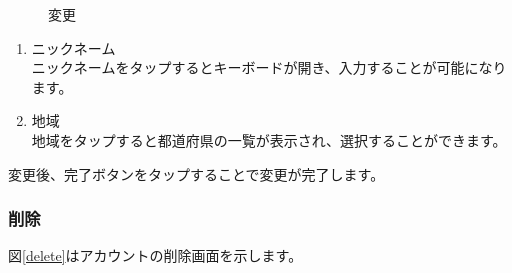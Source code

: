 \documentclass[a4j]{jarticle}
\begin{document}
\begin{figure}[H]
  \begin{center}
    \caption {変更}
    \label{change}
  \end{center}
\end{figure}

\begin{enumerate}
  \renewcommand{\labelenumi}{\textcircled{\scriptsize \theenumi}}
\item ニックネーム\\
  ニックネームをタップするとキーボードが開き、入力することが可能になります。
\item 地域\\
  地域をタップすると都道府県の一覧が表示され、選択することができます。
\end{enumerate}

変更後、完了ボタンをタップすることで変更が完了します。

\newpage
\subsubsection{削除}
図\ref{delete}はアカウントの削除画面を示します。\\
\end{document}
